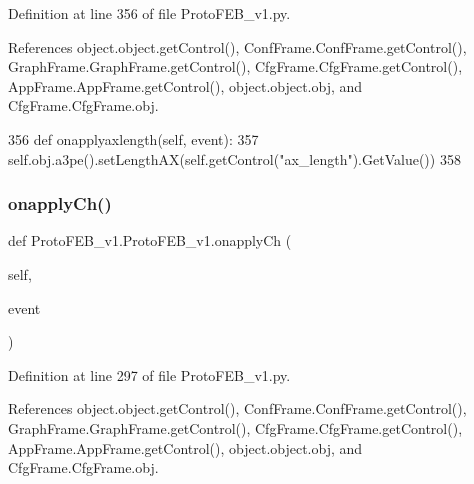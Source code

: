 Definition at line 356 of file Proto\+F\+E\+B\+\_\+v1.\+py.



References object.\+object.\+get\+Control(), Conf\+Frame.\+Conf\+Frame.\+get\+Control(), Graph\+Frame.\+Graph\+Frame.\+get\+Control(), Cfg\+Frame.\+Cfg\+Frame.\+get\+Control(), App\+Frame.\+App\+Frame.\+get\+Control(), object.\+object.\+obj, and Cfg\+Frame.\+Cfg\+Frame.\+obj.


\begin{DoxyCode}
356     \textcolor{keyword}{def }onapplyaxlength(self, event):
357         self.obj.a3pe().setLengthAX(self.getControl(\textcolor{stringliteral}{"ax\_length"}).GetValue())
358 
\end{DoxyCode}
\mbox{\label{classProtoFEB__v1_1_1ProtoFEB__v1_a1dcbf839bbd6f33c1b9de47749d98626}} 
\subsubsection{\texorpdfstring{onapply\+Ch()}{onapplyCh()}}
{\footnotesize\ttfamily def Proto\+F\+E\+B\+\_\+v1.\+Proto\+F\+E\+B\+\_\+v1.\+onapply\+Ch (\begin{DoxyParamCaption}\item[{}]{self,  }\item[{}]{event }\end{DoxyParamCaption})}



Definition at line 297 of file Proto\+F\+E\+B\+\_\+v1.\+py.



References object.\+object.\+get\+Control(), Conf\+Frame.\+Conf\+Frame.\+get\+Control(), Graph\+Frame.\+Graph\+Frame.\+get\+Control(), Cfg\+Frame.\+Cfg\+Frame.\+get\+Control(), App\+Frame.\+App\+Frame.\+get\+Control(), object.\+object.\+obj, and Cfg\+Frame.\+Cfg\+Frame.\+obj.



